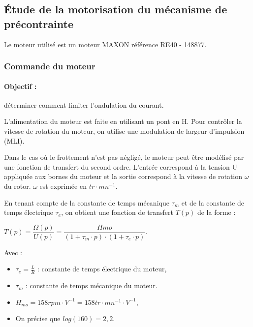 
\subsection{Étude de la motorisation du mécanisme de précontrainte}

Le moteur utilisé est un moteur MAXON référence RE40 - 148877.

\subsubsection{Commande du moteur}

\paragraph{Objectif :} déterminer comment limiter l'ondulation du courant.

L'alimentation du moteur est faite en utilisant un pont en H. Pour contrôler la vitesse de rotation du moteur, on utilise une modulation de largeur d'impulsion (MLI).

Dans le cas où le frottement n'est pas négligé, le moteur peut être modélisé par une fonction de transfert du second ordre. L'entrée correspond à la tension U appliquée aux bornes du moteur et la sortie correspond à la vitesse de rotation $\omega$ du rotor. $\omega$ est exprimée en $tr\cdot mn^{-1}$.

En tenant compte de la constante de temps mécanique $\tau_m$ et de la constante de temps électrique $\tau_e$, on obtient une fonction de transfert $T(p)$ de la forme :

\begin{center}
$T(p)=\dfrac{\Omega(p)}{U(p)}=\dfrac{Hmo}{(1+\tau_m\cdot p)\cdot (1+\tau_e\cdot p)}$.
\end{center}

Avec :
\begin{itemize}
 \item $\tau_e=\frac{L}{R}$ : constante de temps électrique du moteur,
 \item $\tau_m$ : constante de temps mécanique du moteur.
 \item $H_{mo}=158rpm\cdot V^{-1}=158tr\cdot mn^{-1}\cdot V^{-1}$,
 \item On précise que $log(160)=2,2$.
\end{itemize}

